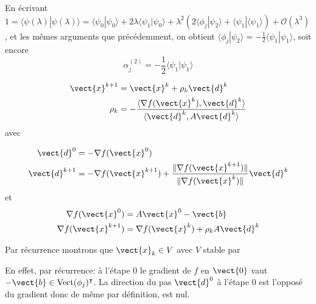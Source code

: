     \item En écrivant $1 = \langle \psi(\lambda )| \psi(\lambda ) \rangle = \langle \psi_0| \psi_0 \rangle + 2\lambda \langle \psi_1 | \psi_0 \rangle  + \lambda^2 (2\langle \phi_j | \psi_2 \rangle + \langle \psi_1|\langle \psi_1\rangle) + \mathcal{O}(\lambda^3)$, et les mêmes arguments que précédemment, on obtient $\langle \phi_j |\psi_2\rangle = -\frac{1}{2} \langle \psi_1 | \psi_1\rangle$, soit encore 
    \begin{equation}
        \alpha_j^{(2)} =  -\frac{1}{2} \langle \psi_1 | \psi_1 \rangle
    \end{equation}
    
    
    
    
    
    
    
    
    
    
    
    
    
    
    
    \begin{align}
    \vect{x}^{k+1} &= \vect{x}^k+\rho_k \vect{d}^k \\
    \rho_k &= -\frac{\langle \nabla f(\vect{x}^k), \vect{d}^k \rangle}{\langle \vect{d}^k, A\vect{d}^k \rangle}
\end{align}
avec

\begin{align}
    \vect{d}^0 &= -\nabla f(\vect{x}^0) \\
    \vect{d}^{k+1} &= -\nabla f (\vect{x}^{k+1}) + \frac{\|\nabla f(\vect{x}^{k+1})\|}{\|\nabla f(\vect{x}^{k})\|} \vect{d}^k
\end{align}
et
\begin{align}
    \nabla f(\vect{x}^0) &= A\vect{x}^0-\vect{b} \\
    \nabla f(\vect{x}^{k+1}) &= \nabla f(\vect{x}^k) + \rho_k A \vect{d}^k
\end{align}



Par récurrence montrons que $\vect{x}_k \in V$ avec $V$ stable par 





En effet, par récurrence: à l'étape $0$ le gradient de $f$ en $\vect{0}$ vaut $-\vect{b}  \in \mathrm{Vect}(\phi_j)^\intercal$. La direction du pas $\vect{d}^0$ à l'étape $0$ est l'opposé du gradient donc de même par définition, est nul.



